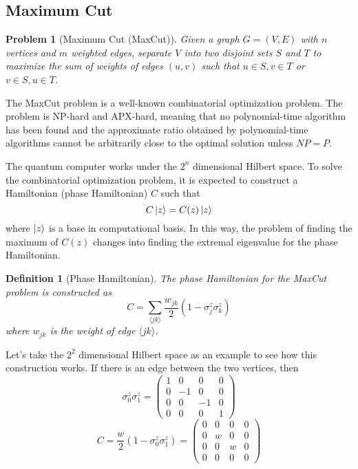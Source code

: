 \documentclass{./source/Report}
\newtheorem{problem}{Problem}
\newtheorem{definition}{Definition}
\begin{document}
\subsection{Maximum Cut}

\begin{problem}[Maximum Cut (MaxCut)]
Given a graph $G =(V, E)$ with $n$ vertices and $m$ weighted edges, separate 
$V$ into two disjoint sets $S$ and $T$ to maximize the sum of weights of edges $(u, v)$ 
such that $u\in S, v\in T$ or $v\in S, u\in T$.
\end{problem}

The MaxCut problem is a well-known combinatorial optimization 
problem. The problem is NP-hard and APX-hard, meaning that no polynomial-time 
algorithm has been found and the approximate ratio obtained by polynomial-time algorithms
cannot be arbitrarily close to the optimal solution unless $NP=P$. 

The quantum computer works under the $2^n$ dimensional Hilbert space. To solve the combinatorial optimization problem, 
it is expected to construct a Hamiltonian (phase Hamiltonian) $C$ such that
\begin{equation}
    C\ket{z}=C(z)\ket{z}
    \label{eq:parallelism}
\end{equation}
where $\ket{z}$ is a base in computational basis. In this way, the problem of finding the maximum of $C(z)$ changes into finding the extremal eigenvalue for the phase Hamiltonian.

\begin{definition}[Phase Hamiltonian]
The phase Hamiltonian for the MaxCut problem is constructed as
\begin{equation}
    C=\sum_{\langle jk\rangle}\frac{w_{jk}}{2}(1-\sigma_j^z\sigma_k^z)
\end{equation}
where $w_{jk}$ is the weight of edge $\langle jk \rangle$.
\end{definition}
Let's take the $2^2$ dimensional Hilbert space as an example to see how this construction works.
If there is an edge between the two vertices, then 
\begin{equation}
    \sigma_0^z\sigma_1^z = 
    \left( \begin{matrix}
        1 & 0 & 0 & 0 \\ 0 & -1 & 0 & 0 \\ 0 & 0 & -1 & 0 \\ 0 & 0 & 0 & 1
    \end{matrix} \right)
\end{equation}
\begin{equation}
    C = \frac{w}{2}(1-\sigma_0^z\sigma_1^z)=
    \left( \begin{matrix}
        0 & 0 & 0 & 0 \\ 0 & w & 0 & 0 \\ 0 & 0 & w & 0 \\ 0 & 0 & 0 & 0
    \end{matrix} \right)
\end{equation}
\end{document}
